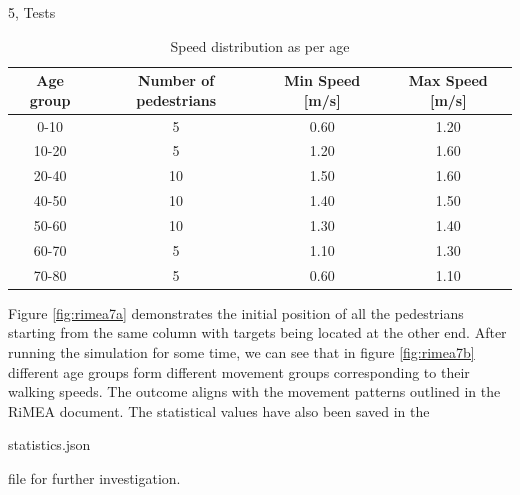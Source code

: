 \documentclass[10pt,a4paper]{article}
\begin{document}
\begin{task}{5, Tests}
\begin{table} [H]
\centering
\begin{tabular}{|c|c|c|c|}
\hline
Age group & Number of pedestrians & Min Speed [m/s] & Max Speed [m/s] \\
\hline
0-10 & 5 & 0.60 & 1.20 \\
10-20 & 5 & 1.20 & 1.60 \\
20-40 & 10 & 1.50 & 1.60 \\
40-50 & 10 & 1.40 & 1.50 \\
50-60 & 10 & 1.30 & 1.40 \\
60-70 & 5 & 1.10 & 1.30 \\
70-80 & 5 & 0.60 & 1.10 \\
\hline
\end{tabular}
\caption{Speed distribution as per age}
\label{table:speedTable}
\end{table}


Figure \ref{fig:rimea7a} demonstrates the initial position of all the pedestrians starting from the same column with targets being located at the other end. After running the simulation for some time, we can see that in figure \ref{fig:rimea7b} different age groups form different movement groups corresponding to their walking speeds. The outcome aligns with the movement patterns outlined in the RiMEA document.\cite{RiMEA} The statistical values have also been saved in the \begin{tt}
    statistics.json
\end{tt} file for further investigation.



\end{task}
\end{document}
